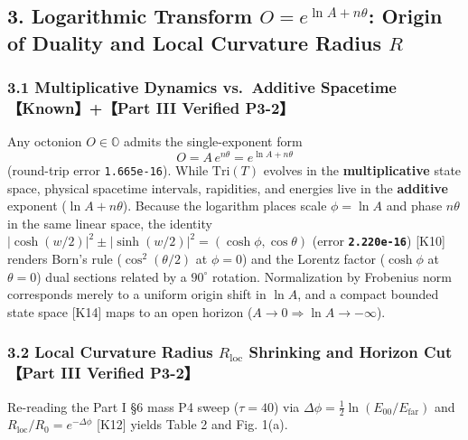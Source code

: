 \documentclass[
  a4paper,
]{article}
\begin{document}
\subsection{\texorpdfstring{3. Logarithmic Transform
\(O = e^{\ln A + n\theta}\): Origin of Duality and Local Curvature
Radius
\(R\)}{3. Logarithmic Transform O = e\^{}\{\textbackslash ln A + n\textbackslash theta\}: Origin of Duality and Local Curvature Radius R}}\label{logarithmic-transform-o-eln-a-ntheta-origin-of-duality-and-local-curvature-radius-r}

\subsubsection{3.1 Multiplicative Dynamics vs.~Additive Spacetime
【Known】+【Part III Verified
P3-2】}\label{multiplicative-dynamics-vs.-additive-spacetime-knownpart-iii-verified-p3-2}

Any octonion \(O \in \mathbb{O}\) admits the single-exponent form
\[O = A\,e^{n\theta} = e^{\ln A + n\theta} \tag{2}\] (round-trip error
\texttt{1.665e-16}). While \(\mathrm{Tri}(T)\) evolves in the
\textbf{multiplicative} state space, physical spacetime intervals,
rapidities, and energies live in the \textbf{additive} exponent
(\(\ln A + n\theta\)). Because the logarithm places scale
\(\phi = \ln A\) and phase \(n\theta\) in the same linear space, the
identity \(|\cosh(w/2)|^2 \pm |\sinh(w/2)|^2 = (\cosh\phi, \cos\theta)\)
(error \textbf{\texttt{2.220e-16}}) {[}K10{]} renders Born's rule
(\(\cos^2(\theta/2)\) at \(\phi=0\)) and the Lorentz factor
(\(\cosh\phi\) at \(\theta=0\)) dual sections related by a \(90^\circ\)
rotation. Normalization by Frobenius norm corresponds merely to a
uniform origin shift in \(\ln A\), and a compact bounded state space
{[}K14{]} maps to an open horizon
(\(A \to 0 \Rightarrow \ln A \to -\infty\)).

\subsubsection{\texorpdfstring{3.2 Local Curvature Radius
\(R_{\mathrm{loc}}\) Shrinking and Horizon Cut 【Part III Verified
P3-2】}{3.2 Local Curvature Radius R\_\{\textbackslash mathrm\{loc\}\} Shrinking and Horizon Cut 【Part III Verified P3-2】}}\label{local-curvature-radius-r_mathrmloc-shrinking-and-horizon-cut-part-iii-verified-p3-2}

Re-reading the Part I §6 mass P4 sweep (\(\tau=40\)) via
\(\Delta\phi = \frac{1}{2}\ln(E_{00}/E_{\mathrm{far}})\) and
\(R_{\mathrm{loc}}/R_0 = e^{-\Delta\phi}\) {[}K12{]} yields Table 2 and
Fig. 1(a).
\end{document}
